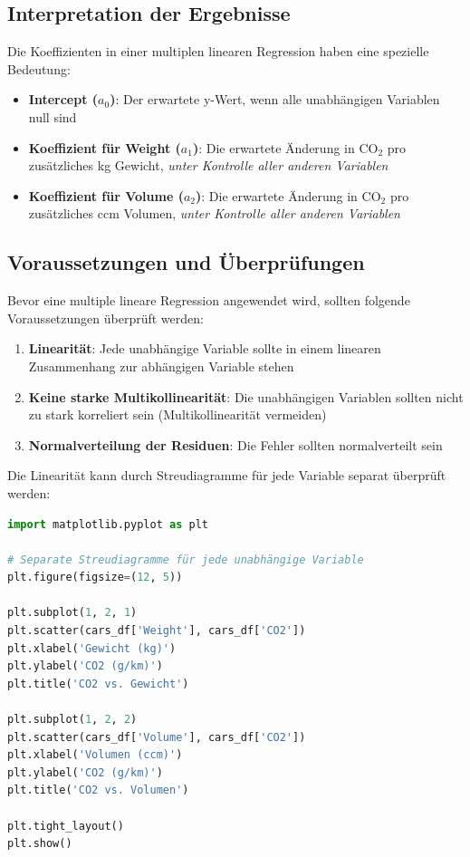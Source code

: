 \subsection{Interpretation der Ergebnisse}

Die Koeffizienten in einer multiplen linearen Regression haben eine spezielle Bedeutung:

\begin{itemize}
	\item \textbf{Intercept ($a_0$)}: Der erwartete y-Wert, wenn alle unabhängigen Variablen null sind
	\item \textbf{Koeffizient für Weight ($a_1$)}: Die erwartete Änderung in CO$_2$ pro zusätzliches kg Gewicht, \textit{unter Kontrolle aller anderen Variablen}
	\item \textbf{Koeffizient für Volume ($a_2$)}: Die erwartete Änderung in CO$_2$ pro zusätzliches ccm Volumen, \textit{unter Kontrolle aller anderen Variablen}
\end{itemize}

\subsection{Voraussetzungen und Überprüfungen}

Bevor eine multiple lineare Regression angewendet wird, sollten folgende Voraussetzungen überprüft werden:

\begin{enumerate}
	\item \textbf{Linearität}: Jede unabhängige Variable sollte in einem linearen Zusammenhang zur abhängigen Variable stehen
	\item \textbf{Keine starke Multikollinearität}: Die unabhängigen Variablen sollten nicht zu stark korreliert sein (Multikollinearität vermeiden)
	\item \textbf{Normalverteilung der Residuen}: Die Fehler sollten normalverteilt sein
\end{enumerate}

Die Linearität kann durch Streudiagramme für jede Variable separat überprüft werden:

\begin{lstlisting}[language=Python]
import matplotlib.pyplot as plt

# Separate Streudiagramme für jede unabhängige Variable
plt.figure(figsize=(12, 5))

plt.subplot(1, 2, 1)
plt.scatter(cars_df['Weight'], cars_df['CO2'])
plt.xlabel('Gewicht (kg)')
plt.ylabel('CO2 (g/km)')
plt.title('CO2 vs. Gewicht')

plt.subplot(1, 2, 2)
plt.scatter(cars_df['Volume'], cars_df['CO2'])
plt.xlabel('Volumen (ccm)')
plt.ylabel('CO2 (g/km)')
plt.title('CO2 vs. Volumen')

plt.tight_layout()
plt.show()
\end{lstlisting}


